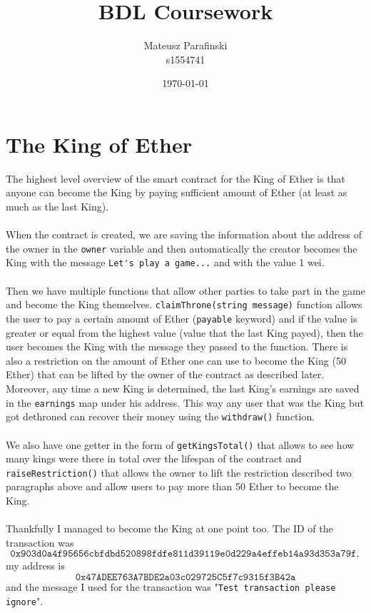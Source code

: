 \documentclass{article}
\title{BDL Coursework}
\author{Mateusz Parafinski\\\small s1554741}
\date{\today}
\begin{document}
    \maketitle

    \section{The King of Ether}
    The highest level overview of the smart contract for the
    King of Ether is that anyone can become the King by
    paying sufficient amount of Ether (at least as much as
    the last King).
    \\ \\
    When the contract is created, we are saving the
    information about the address of the owner in the
    \verb|owner| variable and then automatically the creator
    becomes the King with the message \verb|Let's play a game...| 
    and with the value 1 wei.
    \\ \\
    Then we have multiple functions that allow other parties
    to take part in the game and become the King themselves.
    \verb|claimThrone(string message)| function allows the
    user to pay a certain amount of Ether (\verb|payable|
    keyword) and if the value is greater or equal from the
    highest value (value that the last King payed), then the
    user becomes the King with the message they passed to
    the function. There is also a restriction on the amount
    of Ether one can use to become the King (50 Ether) that
    can be lifted by the owner of the contract as described
    later. Moreover, any time a new King is determined, the
    last King's earnings are saved in the \verb|earnings|
    map under his address. This way any user that was the
    King but got dethroned can recover their money using the
    \verb|withdraw()| function. 
    \\ \\
    We also have one getter in the form of
    \verb|getKingsTotal()| that allows to see how many kings
    were there in total over the lifespan of the contract
    and \verb|raiseRestriction()| that allows the owner to
    lift the restriction described two paragraphs above and
    allow users to pay more than 50 Ether to become the
    King.
    \\ \\
    Thankfully I managed to become the King at one point
    too. The ID of the transaction was 
    \[
        \texttt{0x903d0a4f95656cbfdbd520898fdfe811d39119e0d229a4effeb14a93d353a79f},
    \]
    my address is
    \[
        \texttt{0x47ADEE763A7BDE2a03c029725C5f7c9315f3B42a}
    \]
    and the message I used for the transaction was
    "\verb|Test transaction please ignore|".
\end{document}
